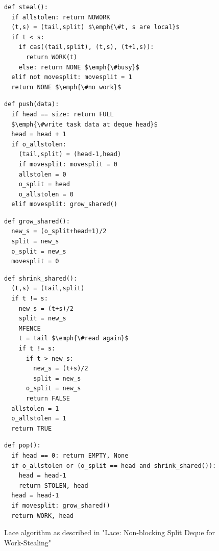 \documentclass{sig-alternate-br}
\begin{document}
\begin{figure}
\begin{lstlisting}
def steal():
  if allstolen: return NOWORK
  (t,s) = (tail,split) $\emph{\#t, s are local}$
  if t < s:
    if cas((tail,split), (t,s), (t+1,s)):
      return WORK(t)
    else: return NONE $\emph{\#busy}$
  elif not movesplit: movesplit = 1
  return NONE $\emph{\#no work}$
\end{lstlisting}
\begin{lstlisting}[firstnumber=10]
def push(data):
  if head == size: return FULL
  $\emph{\#write task data at deque head}$
  head = head + 1
  if o_allstolen:
    (tail,split) = (head-1,head)
    if movesplit: movesplit = 0
    allstolen = 0
    o_split = head
    o_allstolen = 0
  elif movesplit: grow_shared()
\end{lstlisting}
\begin{lstlisting}[firstnumber=21]
def grow_shared():
  new_s = (o_split+head+1)/2
  split = new_s
  o_split = new_s
  movesplit = 0
\end{lstlisting}
\begin{lstlisting}[firstnumber=26]
def shrink_shared():
  (t,s) = (tail,split)
  if t != s:
    new_s = (t+s)/2
    split = new_s
    MFENCE
    t = tail $\emph{\#read again}$
    if t != s:
      if t > new_s:
        new_s = (t+s)/2
        split = new_s
      o_split = new_s
      return FALSE
  allstolen = 1
  o_allstolen = 1
  return TRUE
\end{lstlisting}
\begin{lstlisting}[firstnumber=42]
def pop():
  if head == 0: return EMPTY, None
  if o_allstolen or (o_split == head and shrink_shared()):
    head = head-1
    return STOLEN, head
  head = head-1
  if movesplit: grow_shared()
  return WORK, head
\end{lstlisting}
\caption{Lace algorithm as described in "Lace: Non-blocking Split Deque for Work-Stealing"\cite{vanDijk2014206}}
\label{fig:Lace}
\end{figure}


\end{document}
